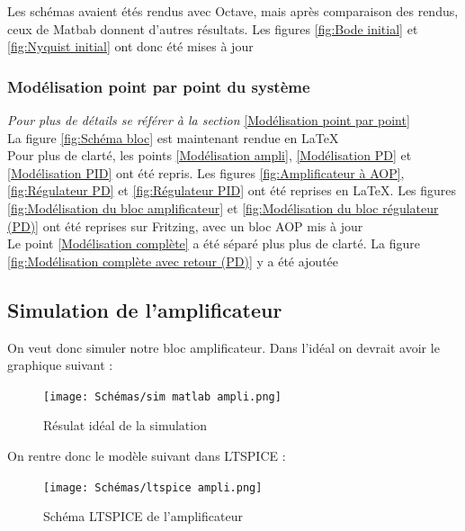 \documentclass[11pt,a4paper]{article}
\begin{document}
Les schémas avaient étés rendus avec Octave, mais après comparaison des rendus, ceux de Matbab donnent d'autres résultats. Les figures \ref{fig:Bode initial} et \ref{fig:Nyquist initial} ont donc été mises à jour

\subsubsection{Modélisation point par point du système}
\textit{Pour plus de détails se référer à la section} \ref{Modélisation point par point}\\

La figure \ref{fig:Schéma bloc} est maintenant rendue en \LaTeX\\

Pour plus de clarté, les points \ref{Modélisation ampli}, \ref{Modélisation PD} et \ref{Modélisation PID} ont été repris. Les figures \ref{fig:Amplificateur à AOP}, \ref{fig:Régulateur PD} et \ref{fig:Régulateur PID} ont été reprises en \LaTeX. Les figures \ref{fig:Modélisation du bloc amplificateur} et \ref{fig:Modélisation du bloc régulateur (PD)} ont été reprises sur Fritzing, avec un bloc AOP mis à jour\\

Le point \ref{Modélisation complète} a été séparé plus plus de clarté. La figure \ref{fig:Modélisation complète avec retour (PD)} y a été ajoutée

\subsection{Simulation de l'amplificateur}
\begin{multicols}{2}
On veut donc simuler notre bloc amplificateur. Dans l'idéal on devrait avoir le graphique suivant :
\begin{figure} [H]
\begin{center}
\texttt{[image: Schémas/sim matlab ampli.png]} 
\end{center}
\caption{Résulat idéal de la simulation}
\end{figure}

On rentre donc le modèle suivant dans LTSPICE :
\begin{figure} [H]
\begin{center}
\texttt{[image: Schémas/ltspice ampli.png]} 
\end{center}
\caption{Schéma LTSPICE de l'amplificateur}
\end{figure}
\label{fig:Simulation ampli}
\end{multicols}
\end{document}
